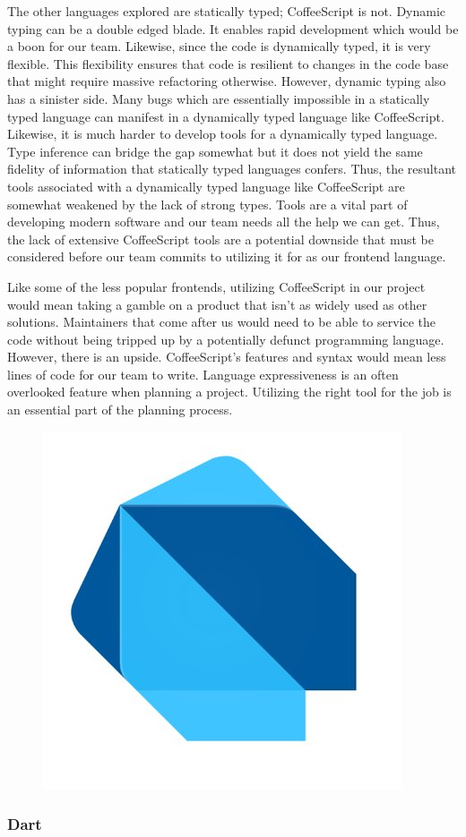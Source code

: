 \documentclass[12pt]{report}
\begin{document}
The other languages explored are statically typed; CoffeeScript is not. Dynamic typing can be a double edged blade. It enables rapid development which would be a boon for our team. Likewise, since the code is dynamically typed, it is very flexible. This flexibility ensures that code is resilient to changes in the code base that might require massive refactoring otherwise. However, dynamic typing also has a sinister side. Many bugs which are essentially impossible in a statically typed language can manifest in a dynamically typed language like CoffeeScript. Likewise, it is much harder to develop tools for a dynamically typed language. Type inference can bridge the gap somewhat but it does not yield the same fidelity of information that statically typed languages confers. Thus, the resultant tools associated with a dynamically typed language like CoffeeScript are somewhat weakened by the lack of strong types. Tools are a vital part of developing modern software and our team needs all the help we can get. Thus, the lack of extensive CoffeeScript tools are a potential downside that must be considered before our team commits to utilizing it for as our frontend language.

Like some of the less popular frontends, utilizing CoffeeScript in our project would mean taking a gamble on a product that isn't as widely used as other solutions. Maintainers that come after us would need to be able to service the code without being tripped up by a potentially defunct programming language. However, there is an upside. CoffeeScript's features and syntax would mean less lines of code for our team to write. Language expressiveness is an often overlooked feature when planning a project. Utilizing the right tool for the job is an essential part of the planning process.

\begin{figure}[h]
	\centering
	\includegraphics[width=0.25\linewidth]{dart}
\end{figure}

\subsubsection*{Dart}
\end{document}
